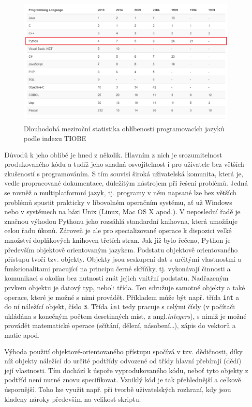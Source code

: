 \documentclass[a4paper, 12pt]{article}
\begin{document}
\begin{figure}[ht!]
    \centering
    \includegraphics[width=\linewidth]{tiobe.png}
    \caption{Dlouhodobá meziroční statistika oblíbenosti programovacích jazyků podle indexu TIOBE}
    \label{fig:tiobe}
\end{figure}

Důvodů k jeho oblibě je hned z několik. Hlavním z nich je srozumitelnost produkovaného kódu a tudíž jeho snadná osvojitelnost i pro uživatele bez větších zkušeností s programováním. S tím souvisí široká uživatelská komunita, která je, vedle propracované dokumentace, důležitým nástrojem při řešení problémů. Jedná se rovněž o multiplatformní jazyk, tj. programy v něm napsané lze bez větších problémů spustit prakticky v libovolném operačním systému, ať už Windows nebo v systémech na bázi Unix (Linux, Mac OS X apod.). V neposlední řadě je značnou výhodou Pythonu jeho rozsáhlá standardní knihovna, která umožňuje celou řadu úkonů. Zároveň je ale pro specializované operace k dispozici velké množství doplňkových knihoven třetích stran.
\vskip 0.1in
\noindent Jak již bylo řečeno, Python je především objektově orientovaným jazykem. Podstatu objektově orientovaného přístupu tvoří tzv. objekty. Objekty jsou seskupení dat s určitými vlastnostmi a funkcionalitami pracující na principu černé skříňky, tj. vykonávají činnosti a komunikaci s okolím bez nutnosti znát jejich vnitřní podstatu. Nadřazeným prvkem objektu je datový typ, neboli třída. Ten sdružuje samotné objekty a také operace, které je možné s nimi provádět. Příkladem může být např. třída \texttt{int} a do ní náležící objekt, číslo \texttt{3}. Třída \texttt{int} tedy pracuje s celými čísly (v počítači ukládána s konečným počtem desetinných míst, z angl.\textit{integers}), s nimiž je možné provádět matematické operace (sčítání, dělení, násobení\ldots), zápis do vektorů a matic apod. \par
Výhoda použití objektově-orientovaného přístupu spočívá v tzv. dědičnosti, díky níž objekty náležící do určité podtřídy odvozené od třídy hlavní přebírají (dědí) její vlastnosti. Tím dochází k úspoře vyprodukovaného kódu, neboť tyto objekty z podtříd není nutné znovu specifikovat. Vzniklý kód je tak přehlednější a celkově úspornější. Toho lze využít např. při tvorbě uživatelských rozhraní, kdy jsou kladeny nároky především na velikost skriptu.
\end{document}
